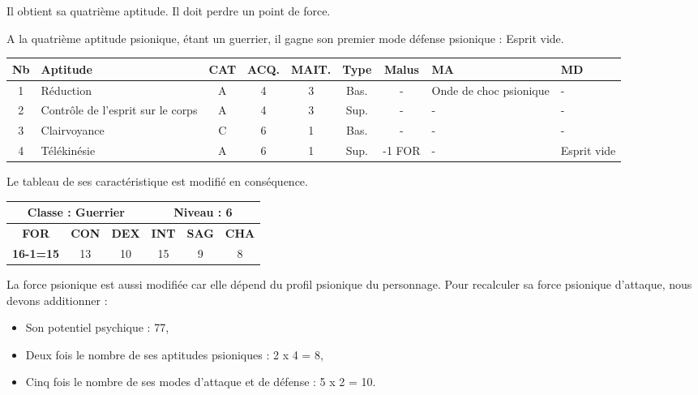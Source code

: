 \documentclass[11pt]{article}
\begin{document}
{\bigskip

Il obtient sa quatrième aptitude. Il doit perdre un point de force.

\bigskip

A la quatrième aptitude psionique, étant un guerrier, il gagne son premier mode défense psionique : Esprit vide.

\bigskip
\begin{tabular}{|c|p{3cm}|c|c|c|c|c|p{2.4cm}|p{2.4cm}|}
\hline
\textbf{Nb} & \textbf{Aptitude} & \textbf{CAT} & \textbf{ACQ.} & \textbf{MAIT.}  & \textbf{Type} & \textbf{Malus} & \textbf{MA} & \textbf{MD} \\ \hline
1 & Réduction                           & A & 4 & 3 & Bas. & - & Onde de choc psionique & - \\ \hline
2 & Contrôle de l'esprit sur le corps   & A & 4 & 3 & Sup. & - & - & - \\ \hline
3 & Clairvoyance                        & C & 6 & 1 & Bas. & -      & - & - \\ \hline
4 & Télékinésie                         & A & 6 & 1 & Sup. & -1 FOR & - & Esprit vide \\ \hline
\end{tabular}

\bigskip

Le tableau de ses caractéristique est modifié en conséquence.

\bigskip

\begin{tabular}{|c|c|c|c|c|c|}
\hline
\multicolumn{3}{|c|}{\textbf{Classe} : Guerrier} & \multicolumn{3}{c|}{\textbf{Niveau} : 6} \\ \hline
\textbf{FOR} & \textbf{CON} & \textbf{DEX} & \textbf{INT} & \textbf{SAG} & \textbf{CHA} \\ \hline
\textbf{16-1=15} & 13 & 10 & 15 & 9 & 8 \\ \hline
\end{tabular}

\bigskip

La force psionique est aussi modifiée car elle dépend du profil psionique du personnage. Pour recalculer sa force psionique d'attaque, nous devons additionner :

\bigskip

\begin{itemize}
\item Son potentiel psychique : 77,
\item Deux fois le nombre de ses aptitudes psioniques : 2 x 4 = 8,
\item Cinq fois le nombre de ses modes d'attaque et de défense : 5 x 2 = 10.
\end{itemize}

}
\end{document}
